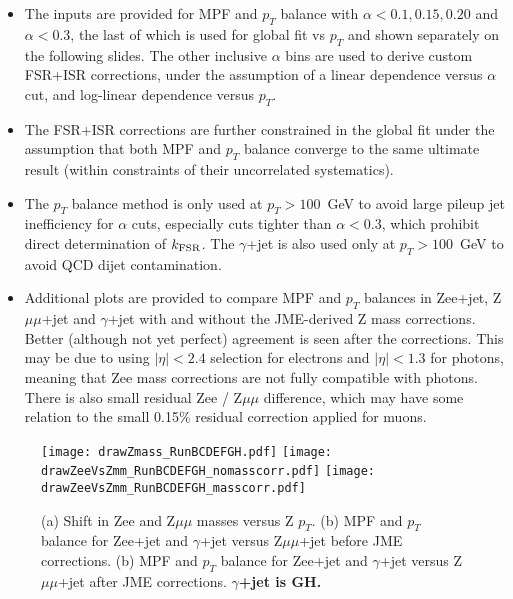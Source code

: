 \documentclass[landscape,10pt]{beamer} %
\begin{document}
\begin{itemize}

\item The inputs are provided for MPF and $p_T$ balance with $\alpha<0.1, 0.15, 0.20$ and $\alpha<0.3$, the last of which is used for global fit vs $p_T$ and shown separately on the following slides. The other inclusive $\alpha$ bins are used to derive custom FSR+ISR corrections, under the assumption of a linear dependence versus $\alpha$ cut, and log-linear dependence versus $p_T$.

\item The FSR+ISR corrections are further constrained in the global fit under the assumption that both MPF and $p_T$ balance converge to the same ultimate result (within constraints of their uncorrelated systematics).

\item The $p_T$ balance method is only used at $p_T>100$~GeV to avoid large pileup jet inefficiency for $\alpha$ cuts, especially cuts tighter than $\alpha<0.3$, which prohibit direct determination of $k_{\rm FSR}$. The $\gamma$+jet is also used only at $p_T>100$~GeV to avoid QCD dijet contamination.

\item Additional plots are provided to compare MPF and $p_T$ balances in Zee+jet, Z$\mu\mu$+jet and $\gamma$+jet with and without the JME-derived Z mass corrections. Better (although not yet perfect) agreement is seen after the corrections. This may be due to using $|\eta|<2.4$ selection for electrons and $|\eta|<1.3$ for photons, meaning that Zee mass corrections are not fully compatible with photons. There is also small residual Zee / Z$\mu\mu$ difference, which may have some relation to the small 0.15\% residual correction applied for muons.

\end{itemize}

\newpage


\begin{figure}[p]
\centering
  \texttt{[image: drawZmass\_RunBCDEFGH.pdf]}
  \texttt{[image: drawZeeVsZmm\_RunBCDEFGH\_nomasscorr.pdf]}
  \texttt{[image: drawZeeVsZmm\_RunBCDEFGH\_masscorr.pdf]}
\caption{
(a) Shift in Zee and Z$\mu\mu$ masses versus Z $p_T$.
(b) MPF and $p_T$ balance for Zee+jet and $\gamma$+jet versus Z$\mu\mu$+jet before JME corrections.
(b) MPF and $p_T$ balance for Zee+jet and $\gamma$+jet versus Z$\mu\mu$+jet after JME corrections.
{\bf $\gamma$+jet is GH.}
}
\end{figure}
\end{document}
